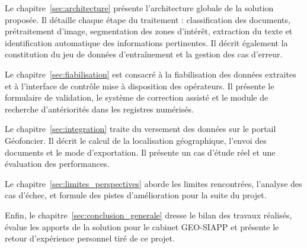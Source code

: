 Le chapitre~\ref{sec:architecture} présente l'architecture globale de la solution proposée. Il détaille chaque étape du traitement : classification des documents, prétraitement d'image, segmentation des zones d'intérêt, extraction du texte et identification automatique des informations pertinentes. Il décrit également la constitution du jeu de données d'entraînement et la gestion des cas d'erreur.

Le chapitre~\ref{sec:fiabilisation} est consacré à la fiabilisation des données extraites et à l'interface de contrôle mise à disposition des opérateurs. Il présente le formulaire de validation, le système de correction assisté et le module de recherche d'antériorités dans les registres numérisés.

Le chapitre~\ref{sec:integration} traite du versement des données sur le portail Géofoncier. Il décrit le calcul de la localisation géographique, l'envoi des documents et le mode d'exportation. Il présente un cas d'étude réel et une évaluation des performances.

Le chapitre~\ref{sec:limites_perspectives} aborde les limites rencontrées, l'analyse des cas d'échec, et formule des pistes d'amélioration pour la suite du projet.

Enfin, le chapitre~\ref{sec:conclusion_generale} dresse le bilan des travaux réalisés, évalue les apports de la solution pour le cabinet GEO-SIAPP et présente le retour d'expérience personnel tiré de ce projet.





